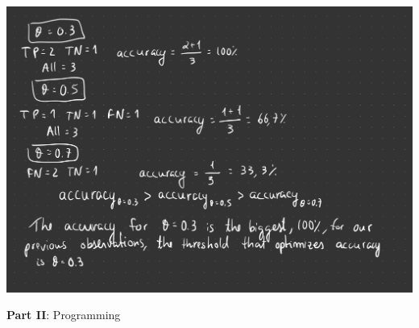\documentclass[12pt]{article}
\begin{document}
\begin{enumerate}[leftmargin=\labelsep]
\begin{center}
\newline
\includegraphics[scale=0.2]{images/Project-20.jpg}
\newline
\end{center}

\end{enumerate}
\newpage
\center\large{\textbf{Part II}: Programming}
\end{document}
